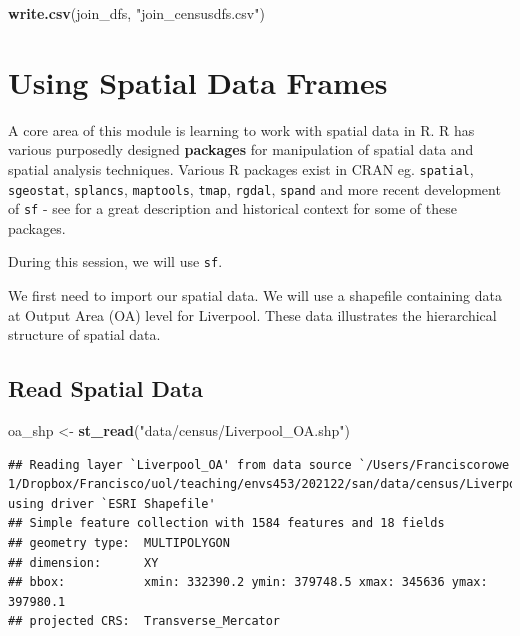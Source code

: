 \documentclass[
]{book}
\newenvironment{Shaded}{\begin{snugshade}}{\end{snugshade}}
\newcommand{\KeywordTok}[1]{\textcolor[rgb]{0.13,0.29,0.53}{\textbf{#1}}}
\newcommand{\NormalTok}[1]{#1}
\newcommand{\StringTok}[1]{\textcolor[rgb]{0.31,0.60,0.02}{#1}}
\begin{document}
\begin{Shaded}
\begin{Highlighting}[]
\KeywordTok{write.csv}\NormalTok{(join_dfs, }\StringTok{"join_censusdfs.csv"}\NormalTok{)}
\end{Highlighting}
\end{Shaded}

\hypertarget{using-spatial-data-frames}{%
\section{Using Spatial Data Frames}\label{using-spatial-data-frames}}

A core area of this module is learning to work with spatial data in R. R has various purposedly designed \textbf{packages} for manipulation of spatial data and spatial analysis techniques. Various R packages exist in CRAN eg. \texttt{spatial}, \texttt{sgeostat}, \texttt{splancs}, \texttt{maptools}, \texttt{tmap}, \texttt{rgdal}, \texttt{spand} and more recent development of \texttt{sf} - see \citet{Lovelace_et_al_2020_book} for a great description and historical context for some of these packages.

During this session, we will use \texttt{sf}.

We first need to import our spatial data. We will use a shapefile containing data at Output Area (OA) level for Liverpool. These data illustrates the hierarchical structure of spatial data.

\hypertarget{read-spatial-data}{%
\subsection{Read Spatial Data}\label{read-spatial-data}}

\begin{Shaded}
\begin{Highlighting}[]
\NormalTok{oa_shp <-}\StringTok{ }\KeywordTok{st_read}\NormalTok{(}\StringTok{"data/census/Liverpool_OA.shp"}\NormalTok{)}
\end{Highlighting}
\end{Shaded}

\begin{verbatim}
## Reading layer `Liverpool_OA' from data source `/Users/Franciscorowe 1/Dropbox/Francisco/uol/teaching/envs453/202122/san/data/census/Liverpool_OA.shp' using driver `ESRI Shapefile'
## Simple feature collection with 1584 features and 18 fields
## geometry type:  MULTIPOLYGON
## dimension:      XY
## bbox:           xmin: 332390.2 ymin: 379748.5 xmax: 345636 ymax: 397980.1
## projected CRS:  Transverse_Mercator
\end{verbatim}
\end{document}
